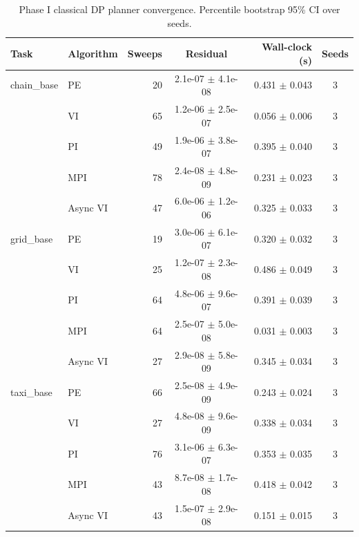 \begin{table}[t]
\centering
\caption{Phase I classical DP planner convergence. Percentile bootstrap 95\% CI over seeds.}
\label{tab:p1b}
\begin{tabular}{llrcrc}
\toprule
Task & Algorithm & Sweeps & Residual & Wall-clock (s) & Seeds \\
\midrule
  chain\_base & PE & 20 & 2.1e-07 $\pm$ 4.1e-08 & 0.431 $\pm$ 0.043 & 3 \\
   & VI & 65 & 1.2e-06 $\pm$ 2.5e-07 & 0.056 $\pm$ 0.006 & 3 \\
   & PI & 49 & 1.9e-06 $\pm$ 3.8e-07 & 0.395 $\pm$ 0.040 & 3 \\
   & MPI & 78 & 2.4e-08 $\pm$ 4.8e-09 & 0.231 $\pm$ 0.023 & 3 \\
   & Async VI & 47 & 6.0e-06 $\pm$ 1.2e-06 & 0.325 $\pm$ 0.033 & 3 \\
\midrule
  grid\_base & PE & 19 & 3.0e-06 $\pm$ 6.1e-07 & 0.320 $\pm$ 0.032 & 3 \\
   & VI & 25 & 1.2e-07 $\pm$ 2.3e-08 & 0.486 $\pm$ 0.049 & 3 \\
   & PI & 64 & 4.8e-06 $\pm$ 9.6e-07 & 0.391 $\pm$ 0.039 & 3 \\
   & MPI & 64 & 2.5e-07 $\pm$ 5.0e-08 & 0.031 $\pm$ 0.003 & 3 \\
   & Async VI & 27 & 2.9e-08 $\pm$ 5.8e-09 & 0.345 $\pm$ 0.034 & 3 \\
\midrule
  taxi\_base & PE & 66 & 2.5e-08 $\pm$ 4.9e-09 & 0.243 $\pm$ 0.024 & 3 \\
   & VI & 27 & 4.8e-08 $\pm$ 9.6e-09 & 0.338 $\pm$ 0.034 & 3 \\
   & PI & 76 & 3.1e-06 $\pm$ 6.3e-07 & 0.353 $\pm$ 0.035 & 3 \\
   & MPI & 43 & 8.7e-08 $\pm$ 1.7e-08 & 0.418 $\pm$ 0.042 & 3 \\
   & Async VI & 43 & 1.5e-07 $\pm$ 2.9e-08 & 0.151 $\pm$ 0.015 & 3 \\
\bottomrule
\end{tabular}
\end{table}
